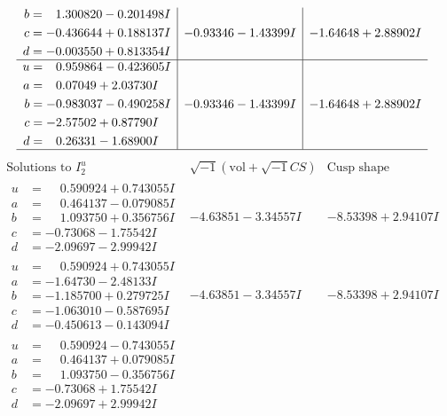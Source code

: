 \documentclass[1p]{elsarticle_modified}
\theoremstyle{definition}
\newcommand{\I}{\sqrt{-1}}
\begin{document}
$$\begin{array}{c|c|c}
\begin{aligned}
b &= \phantom{-}1.300820 - 0.201498 I \\
c &= -0.436644 + 0.188137 I \\
d &= -0.003550 + 0.813354 I\end{aligned}
 & -0.93346 - 1.43399 I & -1.64648 + 2.88902 I \\ \hline\begin{aligned}
u &= \phantom{-}0.959864 - 0.423605 I \\
a &= \phantom{-}0.07049 + 2.03730 I \\
b &= -0.983037 - 0.490258 I \\
c &= -2.57502 + 0.87790 I \\
d &= \phantom{-}0.26331 - 1.68900 I\end{aligned}
 & -0.93346 - 1.43399 I & -1.64648 + 2.88902 I\\
 \hline 
 \end{array}$$\newpage$$\begin{array}{c|c|c}  
\text{Solutions to }I^u_{2}& \I (\text{vol} + \sqrt{-1}CS) & \text{Cusp shape}\\
 \hline 
\begin{aligned}
u &= \phantom{-}0.590924 + 0.743055 I \\
a &= \phantom{-}0.464137 - 0.079085 I \\
b &= \phantom{-}1.093750 + 0.356756 I \\
c &= -0.73068 - 1.75542 I \\
d &= -2.09697 - 2.99942 I\end{aligned}
 & -4.63851 - 3.34557 I & -8.53398 + 2.94107 I \\ \hline\begin{aligned}
u &= \phantom{-}0.590924 + 0.743055 I \\
a &= -1.64730 - 2.48133 I \\
b &= -1.185700 + 0.279725 I \\
c &= -1.063010 - 0.587695 I \\
d &= -0.450613 - 0.143094 I\end{aligned}
 & -4.63851 - 3.34557 I & -8.53398 + 2.94107 I \\ \hline\begin{aligned}
u &= \phantom{-}0.590924 - 0.743055 I \\
a &= \phantom{-}0.464137 + 0.079085 I \\
b &= \phantom{-}1.093750 - 0.356756 I \\
c &= -0.73068 + 1.75542 I \\
d &= -2.09697 + 2.99942 I\end{aligned}

\end{array}$$
\end{document}
